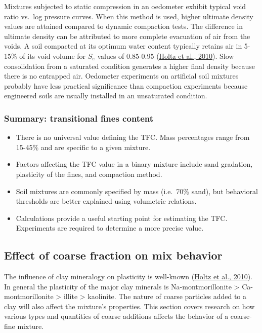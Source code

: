 \documentclass[
  letterpaper,
  openany]{book}
\begin{document}
Mixtures subjected to static compression in an oedometer exhibit typical void ratio vs.~log pressure curves.
When this method is used, higher ultimate density values are attained compared to dynamic compaction tests.
The difference in ultimate density can be attributed to more complete evacuation of air from the voids.
A soil compacted at its optimum water content typically retains air in 5-15\% of its void volume for \(S_e\) values of 0.85-0.95 (\protect\hyperlink{ref-Holtz2010}{Holtz et al., 2010}).
Slow consolidation from a saturated condition generates a higher final density because there is no entrapped air.
Oedometer experiments on artificial soil mixtures probably have less practical significance than compaction experiments because engineered soils are usually installed in an unsaturated condition.

\hypertarget{summary-transitional-fines-content}{%
\subsubsection{Summary: transitional fines content}\label{summary-transitional-fines-content}}

\begin{itemize}
\item
  There is no universal value defining the TFC. Mass percentages range from 15-45\% and are specific to a given mixture.
\item
  Factors affecting the TFC value in a binary mixture include sand gradation, plasticity of the fines, and compaction method.
\item
  Soil mixtures are commonly specified by mass (i.e.~70\% sand), but behavioral thresholds are better explained using volumetric relations.
\item
  Calculations provide a useful starting point for estimating the TFC. Experiments are required to determine a more precise value.
\end{itemize}

\newpage

\hypertarget{coarse-fraction-effects-on-soil-mixtures}{%
\subsection{Effect of coarse fraction on mix behavior}\label{coarse-fraction-effects-on-soil-mixtures}}

The influence of clay mineralogy on plasticity is well-known (\protect\hyperlink{ref-Holtz2010}{Holtz et al., 2010}).
In general the plasticity of the major clay minerals is Na-montmorillonite \textgreater{} Ca-montmorillonite \textgreater{} illite \textgreater{} kaolinite.
The nature of coarse particles added to a clay will also affect the mixture's properties.
This section covers research on how various types and quantities of coarse additions affects the behavior of a coarse-fine mixture.
\end{document}
